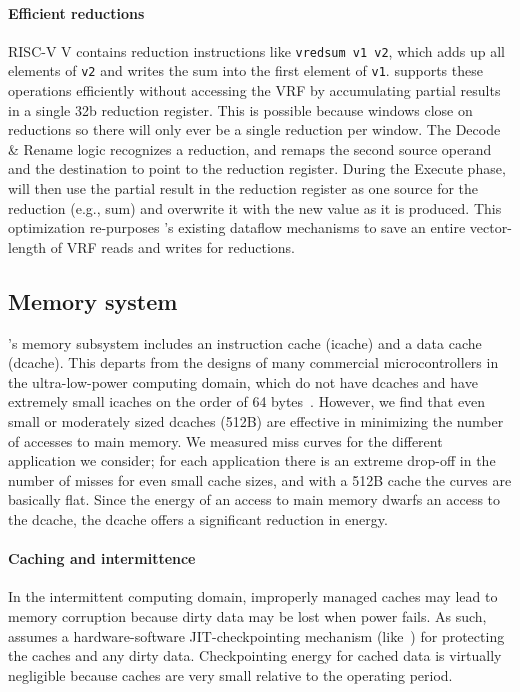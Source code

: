 \paragraph{Efficient reductions}
RISC-V V contains {reduction} instructions like \texttt{vredsum v1 v2},
which adds up all elements of \texttt{v2} and writes the sum into the first element of \texttt{v1}.
%
% 
\manic supports these operations efficiently without accessing the VRF by accumulating partial results in a single 32b reduction register.
% 
This is possible because windows close on reductions so there will only ever be a single reduction per window.
% 
% 
% 
The Decode \& Rename logic recognizes a reduction, and remaps the second source operand and the destination to point to the reduction register.
% 
During the Execute phase, \manic will then use the partial result in the reduction register as one source for the reduction (e.g., sum)
and overwrite it with the new value as it is produced.
% 
This optimization re-purposes \manic's existing dataflow mechanisms
to save an entire vector-length of VRF reads and writes for reductions.

\subsection{Memory system}
\label{manic:manic:memory}
\manic's memory subsystem includes an instruction cache (icache) and a data cache (dcache).
%
This departs from the designs of many commercial microcontrollers 
in the ultra-low-power computing domain, which do
not have dcaches and have extremely small icaches on the order of 
64 bytes~\cite{msp430fr5994}.
%
However, we find that even small or moderately sized dcaches (512B) are effective in minimizing the number of accesses to main memory. 
%
We measured miss curves for the different application we consider; 
for each application there is an extreme drop-off in the number of misses for even 
small cache sizes,  and with a 512B cache the curves are basically flat.
%
Since the energy of an access to main memory dwarfs an access to the dcache,
the dcache offers a significant reduction in energy.

\paragraph{Caching and intermittence}
In the intermittent computing domain, improperly managed caches may
lead to memory corruption because dirty data may be lost when power fails.
%
As such, \manic assumes a hardware-software JIT-checkpointing mechanism
(like~\cite{hibernusplusplus, samoyed, quickrecall}) for protecting the caches
and any dirty data.
%
Checkpointing energy for cached data is virtually negligible because caches are
very small relative to the operating period. 
%

